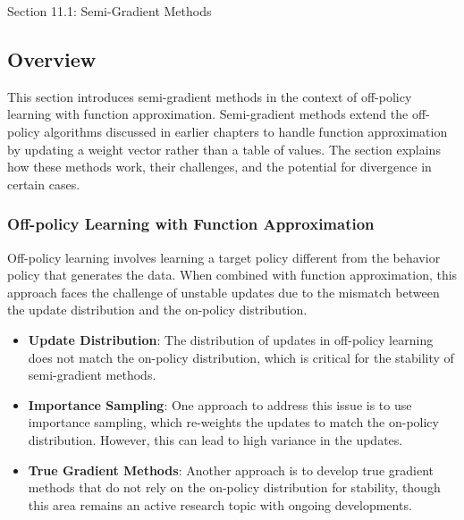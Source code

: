 \begin{notes}{Section 11.1: Semi-Gradient Methods}
    \subsection*{Overview}

    This section introduces semi-gradient methods in the context of off-policy learning with function approximation. Semi-gradient methods extend the off-policy algorithms discussed in earlier chapters to 
    handle function approximation by updating a weight vector rather than a table of values. The section explains how these methods work, their challenges, and the potential for divergence in certain cases.
    
    \subsubsection*{Off-policy Learning with Function Approximation}
    
    Off-policy learning involves learning a target policy different from the behavior policy that generates the data. When combined with function approximation, this approach faces the challenge of unstable 
    updates due to the mismatch between the update distribution and the on-policy distribution.
    
    \begin{highlight}
    
        \begin{itemize}
            \item \textbf{Update Distribution}: The distribution of updates in off-policy learning does not match the on-policy distribution, which is critical for the stability of semi-gradient methods.
            \item \textbf{Importance Sampling}: One approach to address this issue is to use importance sampling, which re-weights the updates to match the on-policy distribution. However, this can lead 
            to high variance in the updates.
            \item \textbf{True Gradient Methods}: Another approach is to develop true gradient methods that do not rely on the on-policy distribution for stability, though this area remains an active 
            research topic with ongoing developments.
        \end{itemize}
    
    \end{highlight}
    

\end{notes}
